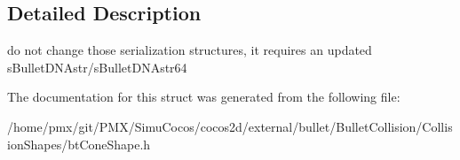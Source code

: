 \subsection{Detailed Description}
do not change those serialization structures, it requires an updated s\+Bullet\+D\+N\+Astr/s\+Bullet\+D\+N\+Astr64 

The documentation for this struct was generated from the following file\+:\begin{DoxyCompactItemize}
\item 
/home/pmx/git/\+P\+M\+X/\+Simu\+Cocos/cocos2d/external/bullet/\+Bullet\+Collision/\+Collision\+Shapes/bt\+Cone\+Shape.\+h\end{DoxyCompactItemize}
